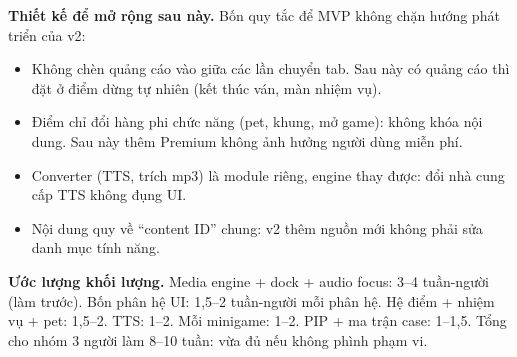 \textbf{Thiết kế để mở rộng sau này.} Bốn quy tắc để MVP không chặn hướng phát triển của v2:

\begin{itemize}
    \item Không chèn quảng cáo vào giữa các lần chuyển tab. Sau này có quảng cáo thì đặt ở điểm dừng tự nhiên (kết thúc ván, màn nhiệm vụ).
    \item Điểm chỉ đổi hàng phi chức năng (pet, khung, mở game): không khóa nội dung. Sau này thêm Premium không ảnh hưởng người dùng miễn phí.
    \item Converter (TTS, trích mp3) là module riêng, engine thay được: đổi nhà cung cấp TTS không đụng UI.
    \item Nội dung quy về ``content ID'' chung: v2 thêm nguồn mới không phải sửa danh mục tính năng.
\end{itemize}

\textbf{Ước lượng khối lượng.} Media engine + dock + audio focus: 3--4 tuần-người (làm trước). Bốn phân hệ UI: 1,5--2 tuần-người mỗi phân hệ. Hệ điểm + nhiệm vụ + pet: 1,5--2. TTS: 1--2. Mỗi minigame: 1--2. PIP + ma trận case: 1--1,5. Tổng cho nhóm 3 người làm 8--10 tuần: vừa đủ nếu không phình phạm vi.
